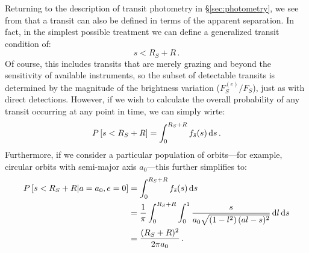Returning to the description of transit photometry in \S\ref{sec:photometry}, we see from  that a transit can also be defined in terms of the apparent separation.  In fact, in the simplest possible treatment we can define a generalized transit condition of:
\begin{equation}\label{eq:transitCondition}
s < R_S + R \,.
\end{equation}
Of course, this includes transits that are merely grazing and beyond the sensitivity of available instruments, so the subset of detectable transits is determined by the magnitude of the brightness variation ($F^{(e)}_S/F_S$), just as with direct detections.  However, if we wish to calculate the overall probability of any transit occurring at any point in time, we can simply wirte:
\begin{equation}
P\left[s < R_S + R\right] = \int_0^{R_S + R} f_{\bar s} (s) \,\mathrm{d}s \,.
\end{equation}
Furthermore, if we consider a particular population of orbits---for example, circular orbits with semi-major axis $a_0$---this further simplifies to:
\begin{equation}
\begin{split}\label{eq:instTransitProb}
P\left[s < R_S + R| a=a_0, e=0\right] &= \int_0^{R_S + R} f_{\bar s} (s) \,\mathrm{d}s \\
&= \frac{1}{\pi} \int_0^{R_S + R}  \int_{0}^1  \frac{s}{a_0\sqrt{\left(1 - l^2\right)(al-s)^2}} \,\mathrm{d}l \,\mathrm{d}s\\
 &= \frac{(R_S + R)^2}{2\pi a_0} \,.
\end{split}
\end{equation}

